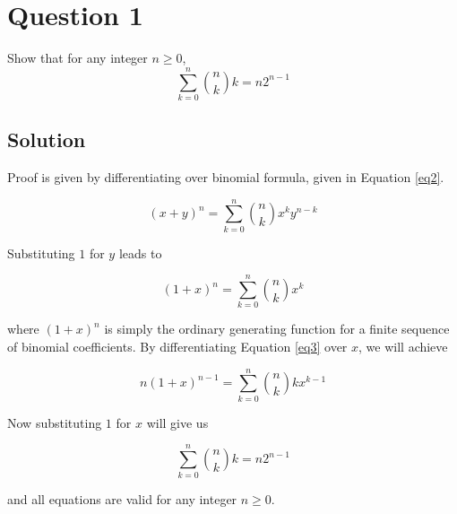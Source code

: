 
\section*{Question 1}
Show that for any integer $n \geq 0$,
\begin{equation}
\sum_{k=0}^{n} {n \choose k}k = n2^{n-1}
\end{equation}

\subsection*{Solution}

Proof is given by differentiating over binomial formula, given in Equation \ref{eq2}.

\begin{equation}
(x + y)^n = \sum_{k=0}^{n}{n \choose k}x^ky^{n-k}
\label{eq2}
\end{equation}

Substituting $1$ for $y$ leads to

\begin{equation}
(1 + x)^n = \sum_{k=0}^{n}{n \choose k}x^k
\label{eq3}
\end{equation}

where $(1 + x)^n$ is simply the ordinary generating function for a finite sequence of binomial coefficients. By differentiating Equation \ref{eq3} over $x$, we will achieve

\begin{equation}
n(1+x)^{n-1} = \sum_{k=0}^{n} {n \choose k}kx^{k-1}
\end{equation}

Now substituting $1$ for $x$ will give us

\begin{equation}
\sum_{k=0}^{n}{n \choose k}k = n2^{n-1}
\end{equation}

and all equations are valid for any integer $n \geq 0$.
